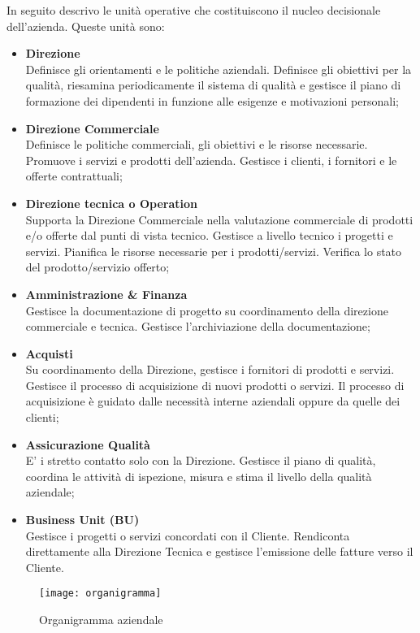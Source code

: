 In seguito descrivo le unità operative che costituiscono il nucleo decisionale dell'azienda. 
Queste unità sono:
\begin{itemize}
	\item \textbf{Direzione}\\ 
	Definisce gli orientamenti e le politiche aziendali. Definisce gli obiettivi 
	per la qualità, riesamina periodicamente il sistema di qualità e gestisce 
	il piano di formazione dei dipendenti in funzione alle esigenze e motivazioni 
	personali;
	\item \textbf{Direzione Commerciale}\\
	Definisce le politiche commerciali, gli obiettivi e le risorse necessarie.
	Promuove i servizi e prodotti dell'azienda. Gestisce i clienti, i fornitori 
	e le offerte contrattuali;
	\item \textbf{Direzione tecnica o Operation}\\
	Supporta la Direzione Commerciale nella valutazione commerciale di prodotti 
	e/o offerte dal punti di vista tecnico. Gestisce a livello tecnico i progetti 
	e servizi. Pianifica le risorse necessarie per i prodotti/servizi. Verifica 
	lo stato del prodotto/servizio offerto;	
	\item \textbf{Amministrazione \& Finanza}\\
	Gestisce la documentazione di progetto su coordinamento della direzione 
	commerciale e tecnica. Gestisce l'archiviazione della documentazione;
	\item \textbf{Acquisti}\\
	Su coordinamento della Direzione, gestisce i fornitori di prodotti e servizi. 
	Gestisce il processo di acquisizione di nuovi prodotti o servizi. Il 
	processo di acquisizione è guidato dalle necessità interne aziendali oppure 
	da quelle dei clienti;
	\item \textbf{Assicurazione Qualità}\\
	E' i stretto contatto solo con la Direzione. Gestisce il piano di qualità, 
	coordina le attività di ispezione, misura e stima il livello della 
	qualità aziendale;
	\item \textbf{Business Unit (BU)}\\
	Gestisce i progetti o servizi concordati con il Cliente. Rendiconta 
	direttamente alla Direzione Tecnica e gestisce l'emissione delle 
	fatture verso il Cliente. 
\end{itemize}


\begin{figure}[htbp]
	\begin{center}
		\texttt{[image: organigramma]}
		\caption{Organigramma aziendale}
	\end{center}
\end{figure}



